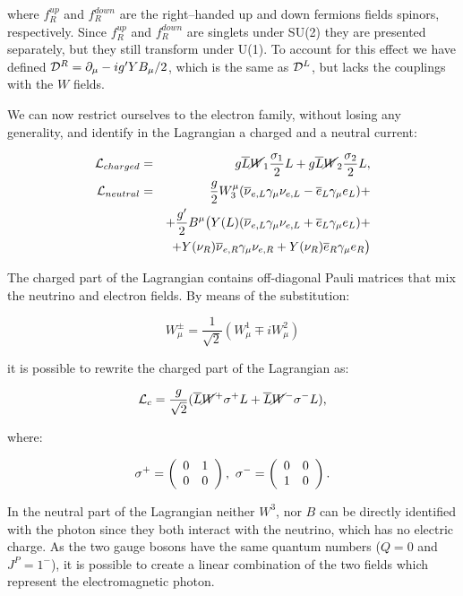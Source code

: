 where $f^{up}_R$ and $f^{down}_R$ are the right--handed up and down fermions fields spinors, respectively. Since $f^{up}_R$ and $f^{down}_R$ are singlets under SU(2) they are presented separately, but they still transform under U(1). To account for this effect we have defined $\mathcal{D}^R = \partial_\mu - ig'YB_\mu/2$, which is the same as $\mathcal{D}^L$, but lacks the couplings with the $W$ fields. 

We can now restrict ourselves to the electron family, without losing any generality, and identify in the Lagrangian a charged and a neutral current:

\begin{eqnarray}
\mathcal{L}_{charged} &=& g \overline{L} \cancel{W}_1 \dfrac{\sigma_1}{2}L + g \overline{L} \cancel{W}_2 \dfrac{\sigma_2}{2}L, \\ 
\mathcal{L}_{neutral} &=& \dfrac{g}{2} W_3^\mu (\overline{\nu}_{e,L}\gamma_\mu\nu_{e,L} - \overline{e}_L\gamma_\mu e_L) +  \nonumber \\
& & + \dfrac{g'}{2} B^\mu \mathbf{\big(} Y(L) ( \overline{\nu}_{e,L}\gamma_\mu\nu_{e,L} + \overline{e}_L\gamma_\mu e_L ) + \nonumber \\
& & + Y(\nu_R) \overline{\nu}_{e,R}\gamma_\mu\nu_{e,R} + Y(\nu_R)  \overline{e}_R\gamma_\mu e_R \mathbf{\big)}
\end{eqnarray}

The charged part of the Lagrangian contains off-diagonal Pauli matrices that mix the neutrino and electron fields. By means of the substitution:

\begin{equation}
W^\pm_\mu = \frac{1}{\sqrt{2}}(W^{1}_{\mu} \mp i W^{2}_{\mu})
\label{eq:wpm_def}
\end{equation}

it is possible to rewrite the charged part of the Lagrangian as:

\begin{equation}
\mathcal{L}_c = \frac{g}{\sqrt{2}}(\overline{L}\cancel{W}^{+} \sigma^{+} L +\overline{L}\cancel{W}^{-}\sigma^{-} L),
\end{equation}

where:

\begin{equation}
\sigma^+ = \left(\begin{array}{cc}0 & 1 \\0 & 0\end{array}\right),\,\, \sigma^- = \left(\begin{array}{cc}0 & 0 \\1 & 0\end{array}\right).
\end{equation}

In the neutral part of the Lagrangian neither $W^3$, nor $B$ can be directly identified with the photon since they both interact with the neutrino, which has no electric charge. As the two gauge bosons have the same quantum numbers ($Q = 0$ and $J^P = 1^-$), it is possible to create a linear combination of the two fields which represent the electromagnetic photon.

